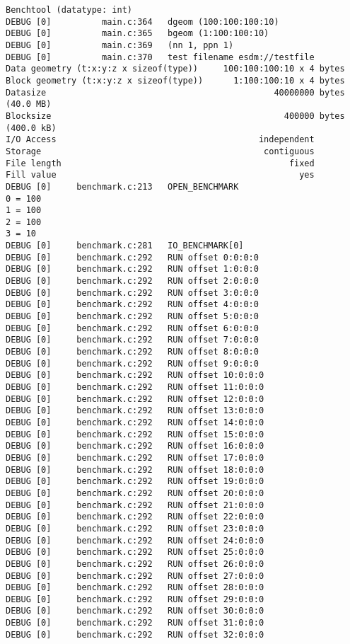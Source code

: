 \begin{verbatim}
Benchtool (datatype: int)
DEBUG [0]          main.c:364   dgeom (100:100:100:10)
DEBUG [0]          main.c:365   bgeom (1:100:100:10)
DEBUG [0]          main.c:369   (nn 1, ppn 1)
DEBUG [0]          main.c:370   test filename esdm://testfile
Data geometry (t:x:y:z x sizeof(type))     100:100:100:10 x 4 bytes
Block geometry (t:x:y:z x sizeof(type))      1:100:100:10 x 4 bytes
Datasize                                             40000000 bytes                (40.0 MB)
Blocksize                                              400000 bytes                (400.0 kB)
I/O Access                                        independent
Storage                                            contiguous
File length                                             fixed
Fill value                                                yes
DEBUG [0]     benchmark.c:213   OPEN_BENCHMARK
0 = 100
1 = 100
2 = 100
3 = 10
DEBUG [0]     benchmark.c:281   IO_BENCHMARK[0]
DEBUG [0]     benchmark.c:292   RUN offset 0:0:0:0
DEBUG [0]     benchmark.c:292   RUN offset 1:0:0:0
DEBUG [0]     benchmark.c:292   RUN offset 2:0:0:0
DEBUG [0]     benchmark.c:292   RUN offset 3:0:0:0
DEBUG [0]     benchmark.c:292   RUN offset 4:0:0:0
DEBUG [0]     benchmark.c:292   RUN offset 5:0:0:0
DEBUG [0]     benchmark.c:292   RUN offset 6:0:0:0
DEBUG [0]     benchmark.c:292   RUN offset 7:0:0:0
DEBUG [0]     benchmark.c:292   RUN offset 8:0:0:0
DEBUG [0]     benchmark.c:292   RUN offset 9:0:0:0
DEBUG [0]     benchmark.c:292   RUN offset 10:0:0:0
DEBUG [0]     benchmark.c:292   RUN offset 11:0:0:0
DEBUG [0]     benchmark.c:292   RUN offset 12:0:0:0
DEBUG [0]     benchmark.c:292   RUN offset 13:0:0:0
DEBUG [0]     benchmark.c:292   RUN offset 14:0:0:0
DEBUG [0]     benchmark.c:292   RUN offset 15:0:0:0
DEBUG [0]     benchmark.c:292   RUN offset 16:0:0:0
DEBUG [0]     benchmark.c:292   RUN offset 17:0:0:0
DEBUG [0]     benchmark.c:292   RUN offset 18:0:0:0
DEBUG [0]     benchmark.c:292   RUN offset 19:0:0:0
DEBUG [0]     benchmark.c:292   RUN offset 20:0:0:0
DEBUG [0]     benchmark.c:292   RUN offset 21:0:0:0
DEBUG [0]     benchmark.c:292   RUN offset 22:0:0:0
DEBUG [0]     benchmark.c:292   RUN offset 23:0:0:0
DEBUG [0]     benchmark.c:292   RUN offset 24:0:0:0
DEBUG [0]     benchmark.c:292   RUN offset 25:0:0:0
DEBUG [0]     benchmark.c:292   RUN offset 26:0:0:0
DEBUG [0]     benchmark.c:292   RUN offset 27:0:0:0
DEBUG [0]     benchmark.c:292   RUN offset 28:0:0:0
DEBUG [0]     benchmark.c:292   RUN offset 29:0:0:0
DEBUG [0]     benchmark.c:292   RUN offset 30:0:0:0
DEBUG [0]     benchmark.c:292   RUN offset 31:0:0:0
DEBUG [0]     benchmark.c:292   RUN offset 32:0:0:0

\end{verbatim}
